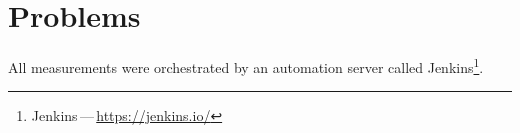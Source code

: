 %
%
%
%

\newpage
\section{Problems}
All measurements were orchestrated by an automation server called Jenkins\footnote{Jenkins\,---\,\url{https://jenkins.io/}}.
